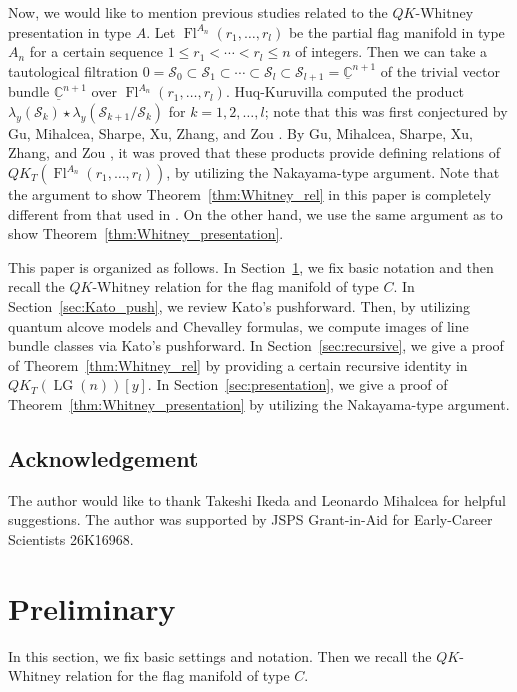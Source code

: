 \documentclass[a4paper, 11pt, reqno]{amsart}
\numberwithin{equation}{section}
\newcommand{\BC}{\mathbb{C}}
\newcommand{\udBC}{\underline{\BC}}
\newcommand{\CS}{\mathcal{S}}
\newcommand{\LG}{\operatorname{LG}}
\newcommand{\Fl}{\operatorname{Fl}}
\theoremstyle{plain}
\theoremstyle{definition}
\theoremstyle{remark}
\begin{document}
Now, we would like to mention previous studies related to the $QK$-Whitney presentation in type $A$. 
Let $\Fl^{A_{n}}(r_{1}, \ldots, r_{l})$ be the partial flag manifold in type $A_{n}$ for a certain sequence $1 \le r_{1} < \cdots < r_{l} \le n$ of integers. 
Then we can take a tautological filtration $0 = \CS_{0} \subset \CS_{1} \subset \cdots \subset \CS_{l} \subset \CS_{l+1} = \udBC^{n+1}$ of the trivial vector bundle $\udBC^{n+1}$ over $\Fl^{A_{n}}(r_{1}, \ldots, r_{l})$. Huq-Kuruvilla \cite{HK} computed the product $\lambda_{y}(\CS_{k}) \star \lambda_{y}(\CS_{k+1}/\CS_{k})$ for $k = 1, 2, \ldots, l$; note that this was first conjectured by Gu, Mihalcea, Sharpe, Xu, Zhang, and Zou \cite{GMSXZZ}. By Gu, Mihalcea, Sharpe, Xu, Zhang, and Zou \cite{GMSXZZ2}, it was proved that these products provide defining relations of $QK_{T}(\Fl^{A_{n}}(r_{1}, \ldots, r_{l}))$, by utilizing the Nakayama-type argument. 
Note that the argument to show Theorem~\ref{thm:Whitney_rel} in this paper is completely different from that used in \cite{HK}. On the other hand, we use the same argument as \cite{GMSXZZ2} to show Theorem~\ref{thm:Whitney_presentation}. 

This paper is organized as follows. 
In Section~\ref{sec:preliminary}, we fix basic notation and then recall the $QK$-Whitney relation for the flag manifold of type $C$. 
In Section~\ref{sec:Kato_push}, we review Kato's pushforward. Then, by utilizing quantum alcove models and Chevalley formulas, we compute images of line bundle classes via Kato's pushforward. 
In Section~\ref{sec:recursive}, we give a proof of Theorem~\ref{thm:Whitney_rel} by providing a certain recursive identity in $QK_{T}(\LG(n))[y]$. 
In Section~\ref{sec:presentation}, we give a proof of Theorem~\ref{thm:Whitney_presentation} by utilizing the Nakayama-type argument. 


\subsection*{Acknowledgement}
The author would like to thank Takeshi Ikeda and Leonardo Mihalcea for helpful suggestions. 
The author was supported by JSPS Grant-in-Aid for Early-Career Scientists 26K16968. 

\section{Preliminary} \label{sec:preliminary}
In this section, we fix basic settings and notation. Then we recall the $QK$-Whitney relation for the flag manifold of type $C$.  
\end{document}
